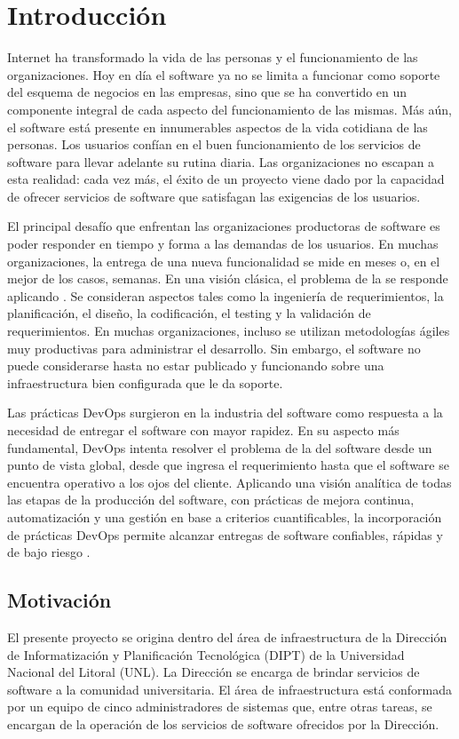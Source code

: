 %
\chapter{Introducción}
%
Internet ha transformado la vida de las personas y el funcionamiento
de las organizaciones. Hoy en día el software ya no se limita a
funcionar como soporte del esquema de negocios en las empresas, sino
que se ha convertido en un componente integral de cada aspecto del
funcionamiento de las mismas. Más aún, el software está presente en
innumerables aspectos de la vida cotidiana de las personas. Los
usuarios confían en el buen funcionamiento de los servicios de
software para llevar adelante su rutina diaria. Las organizaciones no
escapan a esta realidad: cada vez más, el éxito de un proyecto viene
dado por la capacidad de ofrecer servicios de software que satisfagan
las exigencias de los usuarios.

El principal desafío que enfrentan las organizaciones productoras de
software es poder responder en tiempo y forma a las demandas de los
usuarios. En muchas organizaciones, la entrega de una nueva
funcionalidad se mide en meses o, en el mejor de los casos,
semanas. En una visión clásica, el problema de la  se responde aplicando . Se
consideran aspectos tales como la ingeniería de requerimientos, la
planificación, el diseño, la codificación, el testing y la validación
de requerimientos. En muchas organizaciones, incluso se utilizan
metodologías ágiles muy productivas para administrar el
desarrollo. Sin embargo, el software no puede considerarse
 hasta no estar publicado y funcionando sobre una
infraestructura bien configurada que le da soporte.

Las prácticas DevOps surgieron en la industria del software como
respuesta a la necesidad de entregar el software con mayor rapidez. En
su aspecto más fundamental, DevOps intenta resolver el problema de la
 del software desde un punto de vista global, desde
que ingresa el requerimiento hasta que el software se encuentra
operativo a los ojos del cliente. Aplicando una visión analítica de
todas las etapas de la producción del software, con prácticas de
mejora continua, automatización y una gestión en base a criterios
cuantificables, la incorporación de prácticas DevOps permite alcanzar
entregas de software confiables, rápidas y de bajo riesgo
\cite{humblefarley}.
%
%
\section{Motivación}
%
El presente proyecto se origina dentro del área de infraestructura de
la Dirección de Informatización y Planificación Tecnológica (DIPT) de
la Universidad Nacional del Litoral (UNL). La Dirección se encarga de
brindar servicios de software a la comunidad universitaria. El área de
infraestructura está conformada por un equipo de cinco administradores
de sistemas que, entre otras tareas, se encargan de la operación de
los servicios de software ofrecidos por la Dirección.

